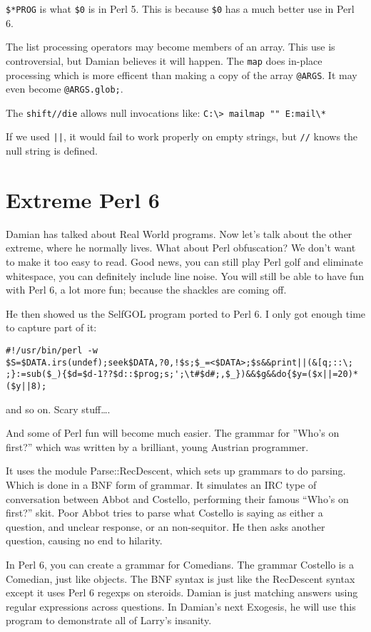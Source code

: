 \documentclass{article}
\begin{document}
\verb'$*PROG' is what \verb'$0' is in Perl 5.  This is because
\verb'$0' has a much better use in Perl 6.

The list processing operators may become members of an array.  This use
is controversial, but Damian believes it will happen.  The \verb'map' does
in-place processing which is more efficent than making a copy of the
array \verb'@ARGS'.  It may even become \verb'@ARGS.glob;'.  

The \verb'shift//die' allows null invocations like: 
\verb'C:\> mailmap "" E:mail\*'

\noindent If we used \verb'||', it would fail to work properly on 
empty strings, but \verb'//' knows the null string is defined.

\section{Extreme Perl 6}

Damian has talked about Real World programs.  Now let's talk about the
other extreme, where he normally lives.  What about Perl obfuscation?
We don't want to make it too easy to read.  Good news, you can still
play Perl golf and eliminate whitespace, you can definitely include line
noise.  You will still be able to have fun with Perl 6, a lot more fun;
because the shackles are coming off.

He then showed us the SelfGOL program ported to Perl 6.  I only got
enough time to capture part of it:

{\small
\begin{verbatim}
#!/usr/bin/perl -w
$S=$DATA.irs(undef);seek$DATA,?0,!$s;$_=<$DATA>;$s&&print||(&[q;::\;
;}:=sub($_){$d=$d-1??$d::$prog;s;';\t#$d#;,$_})&&$g&&do{$y=($x||=20)*($y||8);
\end{verbatim}
} 
\noindent and so on.  Scary stuff\ldots.

And some of Perl fun will become much easier.  The grammar for ''Who's on
first?'' which was written by a brilliant, young Austrian programmer.

It uses the module Parse::RecDescent, which sets up grammars to do
parsing.  Which is done in a BNF form of grammar.  It simulates an IRC
type of conversation between Abbot and Costello, performing their famous
``Who's on first?'' skit.  Poor Abbot tries to parse what Costello is
saying as either a question, and unclear response, or an non-sequitor.
He then asks another question, causing no end to hilarity.

In Perl 6, you can create a grammar for Comedians.  The grammar Costello
is a Comedian, just like objects.  The BNF syntax is just like the
RecDescent syntax except it uses Perl 6 regexps on steroids.  
Damian is just matching answers using regular expressions across
questions.  In Damian's next Exogesis, he will use this program to
demonstrate all of Larry's insanity.
\end{document}
